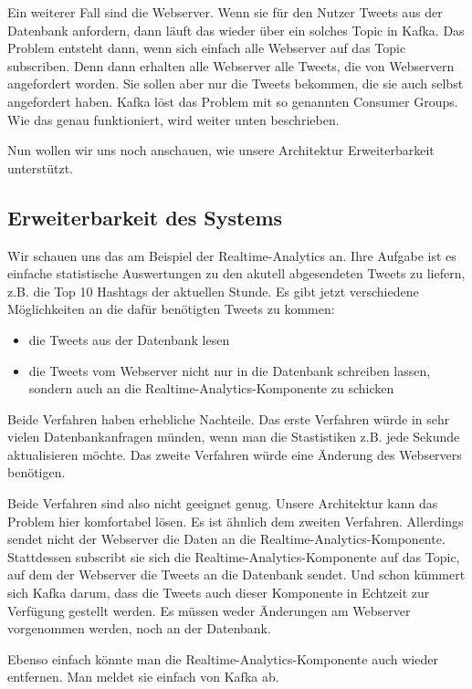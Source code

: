 \begin{itemize}
Ein weiterer Fall sind die Webserver. Wenn sie für den Nutzer Tweets aus der Datenbank anfordern, dann läuft das wieder
über ein solches Topic in Kafka. Das Problem entsteht dann, wenn sich einfach alle Webserver auf das Topic subscriben.
Denn dann erhalten alle Webserver alle Tweets, die von Webservern angefordert worden. Sie sollen aber nur die
Tweets bekommen, die sie auch selbst angefordert haben. Kafka löst das Problem mit so genannten Consumer Groups.
Wie das genau funktioniert, wird weiter unten beschrieben.

Nun wollen wir uns noch anschauen, wie unsere Architektur Erweiterbarkeit unterstützt.

\subsection{Erweiterbarkeit des Systems}
Wir schauen uns das am Beispiel der Realtime-Analytics an. Ihre Aufgabe ist es einfache statistische Auswertungen zu den 
akutell abgesendeten Tweets zu liefern, z.B. die Top 10 Hashtags der aktuellen Stunde. Es gibt jetzt verschiedene Möglichkeiten
an die dafür benötigten Tweets zu kommen:
\begin{itemize}
  \item die Tweets aus der Datenbank lesen
  \item die Tweets vom Webserver nicht nur in die Datenbank schreiben lassen, sondern auch an die Realtime-Analytics-Komponente
zu schicken
\end{itemize}
Beide Verfahren haben erhebliche Nachteile. Das erste Verfahren würde in sehr vielen Datenbankanfragen münden, wenn man
die Stastistiken z.B. jede Sekunde aktualisieren möchte. Das zweite Verfahren würde eine Änderung des Webservers benötigen.

Beide Verfahren sind also nicht geeignet genug. Unsere Architektur kann das Problem hier komfortabel lösen. Es ist ähnlich dem
zweiten Verfahren. Allerdings sendet nicht der Webserver die Daten an die Realtime-Analytics-Komponente. Stattdessen
subscribt sie sich die Realtime-Analytics-Komponente auf das Topic, auf dem der Webserver die Tweets an die Datenbank
sendet. Und schon kümmert sich Kafka darum, dass die Tweets auch dieser Komponente in Echtzeit zur Verfügung gestellt werden.
Es müssen weder Änderungen am Webserver vorgenommen werden, noch an der Datenbank.

Ebenso einfach könnte man die Realtime-Analytics-Komponente auch wieder entfernen. Man meldet sie einfach von Kafka ab.


\end{itemize}
